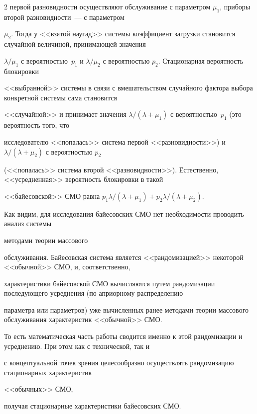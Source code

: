 \begin{multicols}{2}
первой разновидности осуществляют обслуживание с параметром $\mu_1$, приборы второй разновидности~--- с параметром


$\mu_2$. Тогда у <<взятой наугад>> системы коэффициент загрузки становится случайной величиной, принимающей значения


$\lambda/\mu_1$ с ве\-ро\-ятностью~$p_1$ и $\lambda/\mu_2$ с вероятностью $p_2$. Ста\-ци\-о\-нар\-ная вероятность блокировки


<<выбранной>> системы в связи с вмешательством случайного фактора выбора конкретной системы сама становится


<<случайной>> и принимает значения $\lambda/(\lambda+\mu_1)$ с вероятностью~$p_1$ (это вероятность того, что


исследователю <<попалась>> система первой <<разновидности>>) и $\lambda/(\lambda+\mu_2)$ с вероятностью $p_2$


(<<попалась>> система второй <<разновидности>>). Естественно, <<усредненная>> вероятность блокировки в такой


<<байесовской>> СМО равна $p_1\lambda/(\lambda+\mu_1)+p_2\lambda/(\lambda+\mu_2)$.





Как видим, для исследования байесовских СМО нет необходимости проводить анализ сис\-те\-мы %


ме\-то\-да\-ми теории массового


обслуживания. Байесов\-ская система является <<рандомизацией>> не\-ко\-торой <<обычной>> СМО, и, соответственно, %


характеристики байесовской СМО вычисляются путем рандомизации последующего усреднения (по априорному распределению


параметра или параметров) уже вычисленных ранее методами теории массового обслуживания характеристик <<обычной>> СМО.


То есть математическая часть работы сводится именно к этой рандомизации и усреднению. При этом как с технической, так и


с концептуальной точек зрения целесообразно осуществлять рандомизацию стационарных характеристик  


<<обычных>> СМО,


получая стационарные характеристики байесовских СМО.


{





}
\end{multicols}
